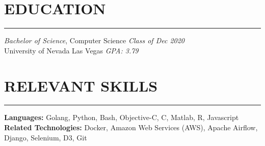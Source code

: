 \documentclass{res}
\begin{document}
\begin{resume}
\vspace{-4pt}

		\section{{EDUCATION}}
    \noindent\rule[0.5ex]{\linewidth}{1pt}
		{\sl Bachelor of Science}, Computer Science \hfill \emph{Class of Dec 2020} \\
		University of Nevada Las Vegas \hfill \emph{GPA: 3.79} \\ \vspace{-5mm}

		\section{{RELEVANT SKILLS}}
    \noindent\rule[0.5ex]{\linewidth}{1pt}
			{\bf Languages:} Golang, Python, Bash, Objective-C, C, Matlab, R, Javascript \\
			{\bf Related Technologies:} Docker, Amazon Web Services (AWS), Apache Airflow, Django, Selenium, D3, Git

	\end{resume}
\end{document}
